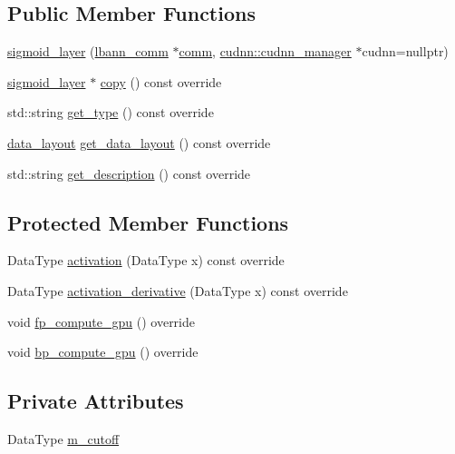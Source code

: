 \subsection*{Public Member Functions}
\begin{DoxyCompactItemize}
\item 
\hyperlink{classlbann_1_1sigmoid__layer_a7e9b873bf8d5c89ad66b7500d3c3f05f}{sigmoid\+\_\+layer} (\hyperlink{classlbann_1_1lbann__comm}{lbann\+\_\+comm} $\ast$\hyperlink{file__io_8cpp_ab048c6f9fcbcfaa57ce68b00263dbebe}{comm}, \hyperlink{classlbann_1_1cudnn_1_1cudnn__manager}{cudnn\+::cudnn\+\_\+manager} $\ast$cudnn=nullptr)
\item 
\hyperlink{classlbann_1_1sigmoid__layer}{sigmoid\+\_\+layer} $\ast$ \hyperlink{classlbann_1_1sigmoid__layer_a9ebc522a655f638eae27e51e759ad72f}{copy} () const override
\item 
std\+::string \hyperlink{classlbann_1_1sigmoid__layer_a5082da099cb5e56910da4373952b98dc}{get\+\_\+type} () const override
\item 
\hyperlink{base_8hpp_a786677cbfb3f5677b4d84f3056eb08db}{data\+\_\+layout} \hyperlink{classlbann_1_1sigmoid__layer_ab44f3cf5e4622578e40d5254ba73109a}{get\+\_\+data\+\_\+layout} () const override
\item 
std\+::string \hyperlink{classlbann_1_1sigmoid__layer_aa921ef4370e6b4fae38536310d7a3a17}{get\+\_\+description} () const override
\end{DoxyCompactItemize}
\subsection*{Protected Member Functions}
\begin{DoxyCompactItemize}
\item 
Data\+Type \hyperlink{classlbann_1_1sigmoid__layer_ab6a237e0a10be2599474dcd2cd73e767}{activation} (Data\+Type x) const override
\item 
Data\+Type \hyperlink{classlbann_1_1sigmoid__layer_a2736bf99e3304083cd964f6707c2f666}{activation\+\_\+derivative} (Data\+Type x) const override
\item 
void \hyperlink{classlbann_1_1sigmoid__layer_a1a2c1a56ca20677d4278a5787fa7fc86}{fp\+\_\+compute\+\_\+gpu} () override
\item 
void \hyperlink{classlbann_1_1sigmoid__layer_a30a9ff1cd4ec6d4ef4e60859a10b5936}{bp\+\_\+compute\+\_\+gpu} () override
\end{DoxyCompactItemize}
\subsection*{Private Attributes}
\begin{DoxyCompactItemize}
\item 
Data\+Type \hyperlink{classlbann_1_1sigmoid__layer_ab4a50a9ae123aef61ff3f0c9c066bdff}{m\+\_\+cutoff}
\end{DoxyCompactItemize}
